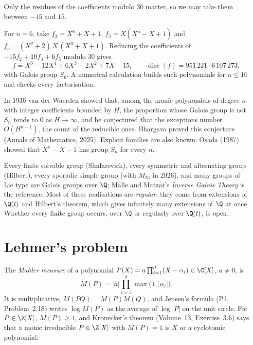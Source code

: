 Only the residues of the coefficients modulo $30$ matter, so we may take them between $-15$ and $15$.

\begin{example}\label{conjectures:exa:sextic}
For $n=6$, take $f_2=X^6+X+1$, $f_3=X(X^5-X+1)$ and $f_5=(X^2+2)\,X\,(X^3+X+1)$. Reducing the coefficients of $-15f_2+10f_3+6f_5$ modulo $30$ gives
\[
f=X^6-12X^4+6X^3+2X^2+7X-15,\qquad \operatorname{disc}(f)=951\,221\cdot6\,107\,273,
\]
with Galois group $S_6$. A numerical calculation builds such polynomials for $n\le10$ and checks every factorisation.
\end{example}

\begin{remark}\label{conjectures:rem:vdw}
In 1936 van der Waerden showed that, among the monic polynomials of degree $n$ with integer coefficients bounded by $H$, the proportion whose Galois group is
not $S_n$ tends to $0$ as $H\to\infty$, and he conjectured that the exceptions number $O(H^{n-1})$, the count of the reducible ones. Bhargava proved this
conjecture (Annals of Mathematics, 2025). Explicit families are also known: Osada (1987) showed that $X^n-X-1$ has group $S_n$ for every $n$.
\end{remark}

\begin{remark}\label{conjectures:rem:igpknown}
Every finite solvable group (Shafarevich), every symmetric and alternating group (Hilbert), every sporadic simple group (with $M_{23}$ in 2026), and many
groups of Lie type are Galois groups over $\Q$; Malle and Matzat's \emph{Inverse Galois Theory} is the reference. Most of these realisations are
\emph{regular}: they come from extensions of $\Q(t)$ and Hilbert's theorem, which gives infinitely many extensions of $\Q$ at once. Whether every finite
group occurs, over $\Q$ or regularly over $\Q(t)$, is open.
\end{remark}

\section{Lehmer's problem}

The \emph{Mahler measure} of a polynomial $P(X)=a\prod_{i=1}^d(X-\alpha_i)\in\C[X]$, $a\ne0$, is
\[
M(P)=|a|\prod_{i=1}^d\max\bigl(1,|\alpha_i|\bigr).
\]
It is multiplicative, $M(PQ)=M(P)M(Q)$, and Jensen's formula (P1, Problem~2.18) writes $\log M(P)$ as the average of $\log|P|$ on the unit circle. For
$P\in\Z[X]$, $M(P)\ge1$, and Kronecker's theorem (Volume~13, Exercise~3.6) says that a monic irreducible $P\in\Z[X]$ with $M(P)=1$ is $X$ or a
cyclotomic polynomial.

